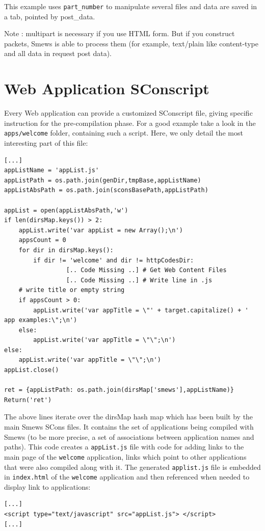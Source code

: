 \documentclass{report}
\begin{document}
This example uses {\tt part\_number} to manipulate several files and data are saved in a tab, pointed by post\_data.

Note : multipart is necessary if you use HTML form. But if you construct packets, Smews is able to process them (for example, text/plain like content-type and all data in request post data).

\section{Web Application SConscript}

Every Web application can provide a customized SConscript file, giving specific instruction for the pre-compilation phase. For a good example take a look in the \texttt{apps/welcome} folder, containing such a script. Here, we only detail the most interesting part of this file:
\lstset{language=python}
\begin{lstlisting}
[...]
appListName = 'appList.js'
appListPath = os.path.join(genDir,tmpBase,appListName)
appListAbsPath = os.path.join(sconsBasePath,appListPath)

appList = open(appListAbsPath,'w')
if len(dirsMap.keys()) > 2:
    appList.write('var appList = new Array();\n')
    appsCount = 0
    for dir in dirsMap.keys():
        if dir != 'welcome' and dir != httpCodesDir:
                 [.. Code Missing ..] # Get Web Content Files
                 [.. Code Missing ..] # Write line in .js
    # write title or empty string
    if appsCount > 0:
        appList.write('var appTitle = \"' + target.capitalize() + '
app examples:\";\n')
    else:
        appList.write('var appTitle = \"\";\n')
else:
    appList.write('var appTitle = \"\";\n')
appList.close()

ret = {appListPath: os.path.join(dirsMap['smews'],appListName)}
Return('ret')
\end{lstlisting}

The above lines iterate over the dirsMap hash map which has been built by the main Smews SCons files. It contains the set of applications being compiled with Smews (to be more precise, a set of associations between application names and paths). This code creates a \verb+appList.js+ file with code for adding links to the main page of the \verb+welcome+ application, links which point to other applications that were also compiled along with it. The generated \verb+applist.js+ file is embedded in \verb+index.html+ of the \verb+welcome+ application and then referenced when needed to display link to applications:
\lstset{language=html}
\begin{lstlisting}
[...]
<script type="text/javascript" src="appList.js"> </script>
[...]
\end{lstlisting}
\end{document}
